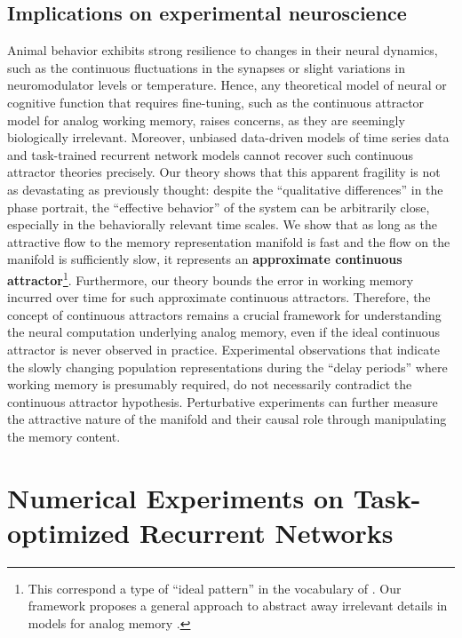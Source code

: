 \documentclass{article} %
\newcounter{ct}
\theoremstyle{definition}
\theoremstyle{remark}
\begin{document}
\subsection{Implications on experimental neuroscience}\label{sec:implications}
Animal behavior exhibits strong resilience to changes in their neural dynamics, such as the continuous fluctuations in the synapses or slight variations in neuromodulator levels or temperature.
Hence, any theoretical model of neural or cognitive function that requires fine-tuning, such as the continuous attractor model for analog working memory, raises concerns, as they are seemingly biologically irrelevant.
Moreover, unbiased data-driven models of time series data and task-trained recurrent network models cannot recover such continuous attractor theories precisely.
Our theory shows that this apparent fragility is not as devastating as previously thought: despite the ``qualitative differences'' in the phase portrait, the ``effective behavior'' of the system can be arbitrarily close, especially in the behaviorally relevant time scales.
We show that as long as the attractive flow to the memory representation manifold is fast and the flow on the manifold is sufficiently slow, it represents an \textbf{approximate continuous attractor}\footnote{This correspond a type of ``ideal pattern'' in the vocabulary of \citet{chirimuuta2024brain}. Our framework proposes a general approach to abstract away irrelevant details in models for analog memory \citep{potochnik2017idealization}.}.
Furthermore, our theory bounds the error in working memory incurred over time for such approximate continuous attractors.
Therefore, the concept of continuous attractors remains a crucial framework for understanding the neural computation underlying analog memory, even if the ideal continuous attractor is never observed in practice.
Experimental observations that indicate the slowly changing population representations during the ``delay periods'' where working memory is presumably required, do not necessarily contradict the continuous attractor hypothesis. 
Perturbative experiments can further measure the attractive nature of the manifold and their causal role through manipulating the memory content.

\citep{kutschireiter2023bayesian,biswas2024fly}

\section{Numerical Experiments on Task-optimized Recurrent Networks}\label{sec:experiments}
\end{document}
